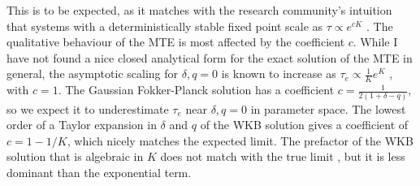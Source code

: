 This is to be expected, as it matches with the research community's intuition that systems with a deterministically stable fixed point scale as $\tau \propto e^{cK}$ \cite{Leigh1981,Lande1993,Kamenev2008,Cremer2009a,Dobrinevski2012,Yu2017}. 
The qualitative behaviour of the MTE is most affected by the coefficient $c$. %
While I have not found a nice closed analytical form for the exact solution of the MTE in general, the asymptotic scaling for $\delta,q = 0$ is known to increase as $\tau_e \propto \frac{1}{K}e^K$ \cite{Lande1993,Lambert2005}, with $c=1$. 
The Gaussian Fokker-Planck solution has a coefficient $c=\frac{1}{2(1+\delta-q)}$, so we expect it to underestimate $\tau_e$ near $\delta,q = 0$ in parameter space. %
The lowest order of a Taylor expansion in $\delta$ and $q$ of the WKB solution gives a coefficient of $c=1-1/K$, which nicely matches the expected limit. 
The prefactor of the WKB solution that is algebraic in $K$ does not match with the true limit \cite{Assaf2010,Badali2019a,Badali2019b}, but it is less dominant than the exponential term. %


